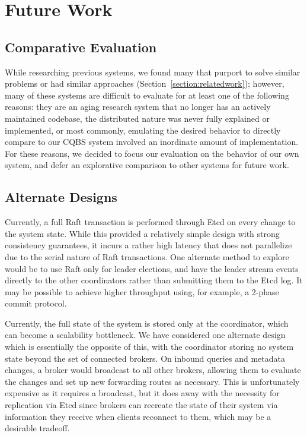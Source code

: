 \section{Future Work}

\subsection{Comparative Evaluation}

While researching previous systems, we found many that purport to solve similar problems or had similar approaches (Section~\ref{section:relatedwork}); however, many of these systems are difficult to evaluate for at least one of the following reasons: they are an aging research system that no longer has an actively maintained codebase, the distributed nature was never fully explained or implemented, or most commonly, emulating the desired behavior to directly compare to our CQBS system involved an inordinate amount of implementation.
For these reasons, we decided to focus our evaluation on the behavior of our own system, and defer an explorative comparison to other systems for future work.

\subsection{Alternate Designs}
\label{subsec:alternate_designs}

Currently, a full Raft transaction is performed through Etcd on every change to the system state.
While this provided a relatively simple design with strong consistency guarantees, it incurs a rather high latency that does not parallelize due to the serial nature of Raft transactions.
One alternate method to explore would be to use Raft only for leader elections, and have the leader stream events directly to the other coordinators rather than submitting them to the Etcd log.
It may be possible to achieve higher throughput using, for example, a 2-phase commit protocol.

Currently, the full state of the system is stored only at the coordinator, which can become a scalability bottleneck.
We have considered one alternate design which is essentially the opposite of this, with the coordinator storing no system state beyond the set of connected brokers.
On inbound queries and metadata changes, a broker would broadcast to all other brokers, allowing them to evaluate the changes and set up new forwarding routes as necessary.
This is unfortunately expensive as it requires a broadcast, but it does away with the necessity for replication via Etcd since brokers can recreate the state of their system via information they receive when clients reconnect to them, which may be a desirable tradeoff.

